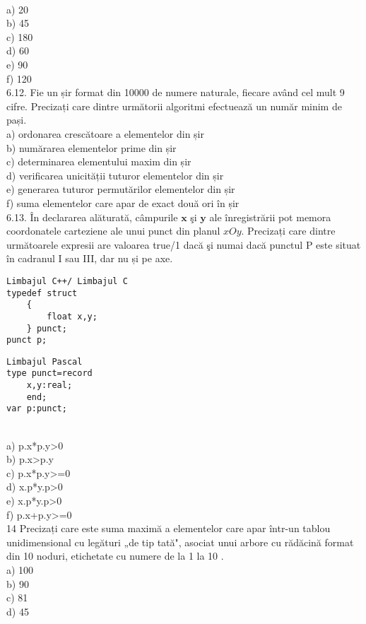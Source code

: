 \\
a) 20
\\
b) 45
\\
c) 180
\\
d) 60
\\
e) 90
\\
f) 120
\\
6.12. Fie un șir format din 10000 de numere naturale, fiecare având cel mult 9 cifre. Precizați care dintre următorii algoritmi efectuează un număr minim de pași.
\\
a) ordonarea crescătoare a elementelor din șir
\\
b) numărarea elementelor prime din șir
\\
c) determinarea elementului maxim din șir
\\
d) verificarea unicității tuturor elementelor din șir
\\
e) generarea tuturor permutărilor elementelor din șir
\\
f) suma elementelor care apar de exact două ori în șir
\\
6.13. În declararea alăturată, câmpurile $\mathbf{x}$ şi $\mathbf{y}$ ale înregistrării pot memora coordonatele carteziene ale unui punct din planul $x O y$. Precizați care dintre următoarele expresii are valoarea true/1 dacă şi numai dacă punctul P este situat în cadranul I sau III, dar nu și pe axe.
\begin{verbatim}
Limbajul C++/ Limbajul C
typedef struct
    {
        float x,y;
    } punct;
punct p;
\end{verbatim}
\begin{verbatim}
Limbajul Pascal
type punct=record
    x,y:real;
    end;
var p:punct;
\end{verbatim}
\\
a) p.x*p.y>0
\\
b) p.x>p.y
\\
c) p.x*p.y>=0
\\
d) x.p*y.p>0
\\
e) x.p*y.p>0
\\
f) p.x+p.y>=0
\\
14 Precizați care este suma maximă a elementelor care apar într-un tablou unidimensional cu legături „de tip tată", asociat unui arbore cu rădăcină format din 10 noduri, etichetate cu numere de la 1 la 10 .
\\
a) 100
\\
b) 90
\\
c) 81
\\
d) 45
\\
